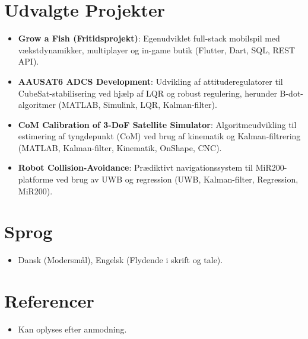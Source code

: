 \documentclass[11pt,a4paper,sans]{moderncv}
\begin{document}
\vspace{3pt}



\section{Udvalgte Projekter}
\vspace{1pt}
\begin{itemize}

\item{\textbf{Grow a Fish (Fritidsprojekt)}: Egenudviklet full-stack mobilspil med vækstdynamikker, multiplayer og in-game butik (Flutter, Dart, SQL, REST API).}

\item{\textbf{AAUSAT6 ADCS Development}: Udvikling af attituderegulatorer til CubeSat-stabilisering ved hjælp af LQR og robust regulering, herunder B-dot-algoritmer (MATLAB, Simulink, LQR, Kalman-filter).}

\item{\textbf{CoM Calibration of 3-DoF Satellite Simulator}: Algoritmeudvikling til estimering af tyngdepunkt (CoM) ved brug af kinematik og Kalman-filtrering (MATLAB, Kalman-filter, Kinematik, OnShape, CNC).}

\item{\textbf{Robot Collision-Avoidance}: Prædiktivt navigationssystem til MiR200-platforme ved brug av UWB og regression (UWB, Kalman-filter, Regression, MiR200).}

\end{itemize}


\section{Sprog}
\vspace{1pt}
\begin{itemize}
\item Dansk (Modersmål), Engelsk (Flydende i skrift og tale).
\end{itemize}


\section{Referencer}
\vspace{1pt}
\begin{itemize}
\item Kan oplyses efter anmodning.
\end{itemize}
\end{document}
